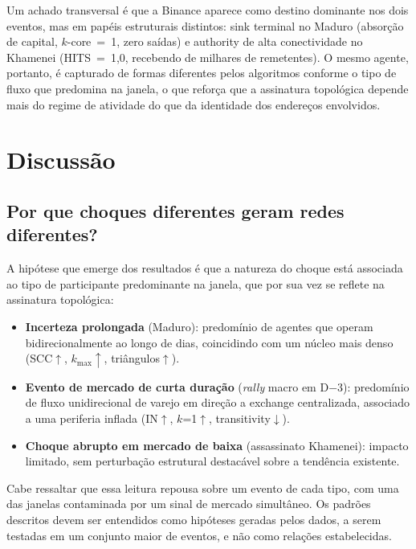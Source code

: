 \documentclass[12pt,a4paper]{article}
\begin{document}
Um achado transversal é que a Binance aparece como destino dominante nos dois eventos, mas em papéis estruturais distintos: sink terminal no Maduro (absorção de capital, $k$-core~=~1, zero saídas) e authority de alta conectividade no Khamenei (HITS~=~1,0, recebendo de milhares de remetentes). O mesmo agente, portanto, é capturado de formas diferentes pelos algoritmos conforme o tipo de fluxo que predomina na janela, o que reforça que a assinatura topológica depende mais do regime de atividade do que da identidade dos endereços envolvidos.

\section{Discussão}

\subsection{Por que choques diferentes geram redes diferentes?}

A hipótese que emerge dos resultados é que a natureza do choque está associada ao tipo de participante predominante na janela, que por sua vez se reflete na assinatura topológica:

\begin{itemize}[nosep]
\item \textbf{Incerteza prolongada} (Maduro): predomínio de agentes que operam bidirecionalmente ao longo de dias, coincidindo com um núcleo mais denso (SCC$\uparrow$, $k_{\max}\uparrow$, triângulos$\uparrow$).
\item \textbf{Evento de mercado de curta duração} (\textit{rally} macro em D$-$3): predomínio de fluxo unidirecional de varejo em direção a exchange centralizada, associado a uma periferia inflada (IN$\uparrow$, $k$=1$\uparrow$, transitivity$\downarrow$).
\item \textbf{Choque abrupto em mercado de baixa} (assassinato Khamenei): impacto limitado, sem perturbação estrutural destacável sobre a tendência existente.
\end{itemize}

Cabe ressaltar que essa leitura repousa sobre um evento de cada tipo, com uma das janelas contaminada por um sinal de mercado simultâneo. Os padrões descritos devem ser entendidos como hipóteses geradas pelos dados, a serem testadas em um conjunto maior de eventos, e não como relações estabelecidas.
\end{document}
